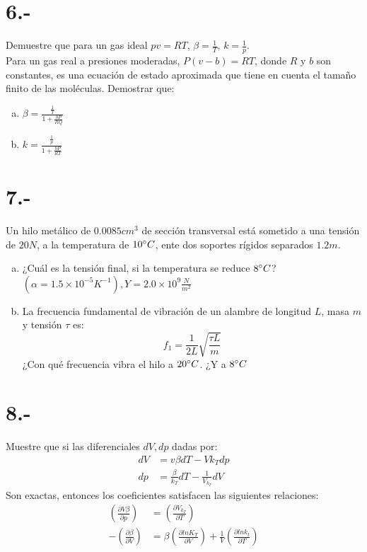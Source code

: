 \documentclass{article}
\begin{document}
\section*{6.-}
Demuestre que para un gas ideal $pv = RT$, $\beta = \frac{1}{T}$, $k = \frac{1}{p}$. \\
Para un gas real a presiones moderadas, $P(v-b) = RT$, donde $R$ y $b$ son constantes, 
es una ecuación de estado aproximada que tiene en cuenta el tamaño finito de las moléculas.
Demostrar que:
\begin{enumerate}[a)]
    \item $\beta = \frac{\frac{1}{T}}{1+\frac{bP}{RQ}}$
    \item $k = \frac{\frac{1}{p}}{1+\frac{bP}{RT}} $
\end{enumerate}

\section*{7.-}
Un hilo metálico de $0.0085cm^3$ de sección transversal está sometido a una tensión de 
$20N$, a la temperatura de $10\degree C$, ente dos soportes rígidos separados $1.2m$. 
\begin{enumerate}[a)]
    \item ¿Cuál es la tensión final, si la temperatura se reduce $8\degree C$?
    $(\alpha = 1.5 \times 10^{-5}K^{-1}), Y = 2.0 \times 10^9 \frac{N}{m^2}$

    \item La frecuencia fundamental de vibración de un alambre de longitud $L$, 
    masa $m$ y tensión $\tau$ es:
    \[ f_1 = \frac{1}{2L} \sqrt{\frac{\tau L}{m}} \]
    ¿Con qué frecuencia vibra el hilo a $20\degree C$. ¿Y a $8\degree C$
\end{enumerate}

\section*{8.-}
Muestre que si las diferenciales $dV, dp$ dadas por:
\begin{align*}
    dV &= v\beta dT - Vk_T dp \\
    dp &= \frac{\beta}{k_T} dT - \frac{1}{V_{k_T}}dV
\end{align*}
Son exactas, entonces los coeficientes satisfacen las siguientes relaciones:
\begin{align*}
    \left( \frac{\partial V\beta}{\partial p} \right)
    &=\left( \frac{\partial V_{k_T}}{\partial T} \right) \\
    - \left( \frac{\partial \beta}{\partial V} \right)
    &=\beta \left( \frac{\partial lnK_T}{\partial V} \right) 
    + \frac{1}{V}\left( \frac{\partial lnk_t}{\partial T} \right)
\end{align*}
\end{document}
